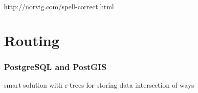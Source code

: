 \documentclass{beamer}
\begin{document}
http://norvig.com/spell-correct.html







\section{Routing}

\begin{frame}
  \frametitle{PostgreSQL and PostGIS}

\end{frame}

\begin{frame}
  smart solution with r-trees for storing data
  intersection of ways
\end{frame}










\end{document}
